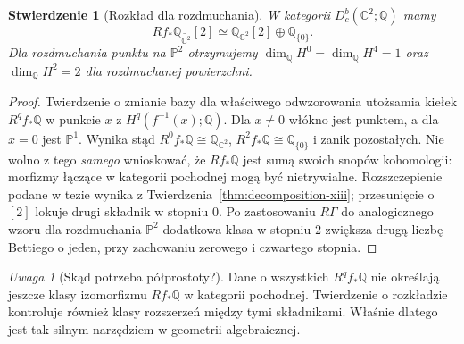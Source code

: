 \documentclass[11pt,a4paper,oneside]{report}
\newcommand{\C}{\mathbb{C}}
\newcommand{\Q}{\mathbb{Q}}
\theoremstyle{plain}
\newtheorem{stwierdzenie}[twierdzenie]{Stwierdzenie}
\theoremstyle{definition}
\theoremstyle{remark}
\newtheorem{uwaga}[twierdzenie]{Uwaga}
\begin{document}
\begin{stwierdzenie}[Rozkład dla rozdmuchania]
\label{prop:blowup-decomp-xiii}
W kategorii $D_c^b(\C^2;\Q)$ mamy
\[
Rf_*\Q_{\widetilde{\C^2}}[2]
\simeq\Q_{\C^2}[2]\oplus\Q_{\{0\}}.
\]
Dla rozdmuchania punktu na $\mathbb P^2$ otrzymujemy
$\dim_\Q H^0=\dim_\Q H^4=1$ oraz
$\dim_\Q H^2=2$ dla rozdmuchanej powierzchni.
\end{stwierdzenie}
\begin{proof}
Twierdzenie o zmianie bazy dla właściwego odwzorowania
utożsamia kiełek $R^qf_*\Q$ w punkcie $x$
z $H^q(f^{-1}(x);\Q)$. Dla $x\ne0$ włókno jest
punktem, a dla $x=0$ jest $\mathbb P^1$.
Wynika stąd $R^0f_*\Q\cong\Q_{\C^2}$,
$R^2f_*\Q\cong\Q_{\{0\}}$ i zanik pozostałych.
Nie wolno z tego \emph{samego} wnioskować, że
$Rf_*\Q$ jest sumą swoich snopów kohomologii:
morfizmy łączące w kategorii pochodnej mogą
być nietrywialne. Rozszczepienie podane w tezie
wynika z Twierdzenia~\ref{thm:decomposition-xiii};
przesunięcie o $[2]$ lokuje drugi składnik
w stopniu $0$. Po zastosowaniu $R\Gamma$
do analogicznego wzoru dla rozdmuchania $\mathbb P^2$
dodatkowa klasa w stopniu $2$ zwiększa drugą
liczbę Bettiego o jeden, przy zachowaniu zerowego
i czwartego stopnia.
\end{proof}
\begin{uwaga}[Skąd potrzeba półprostoty?]
Dane o wszystkich $R^qf_*\Q$ nie określają
jeszcze klasy izomorfizmu $Rf_*\Q$ w kategorii
pochodnej. Twierdzenie o rozkładzie kontroluje
również klasy rozszerzeń między tymi składnikami.
Właśnie dlatego jest tak silnym narzędziem
w geometrii algebraicznej.
\end{uwaga}
\end{document}
